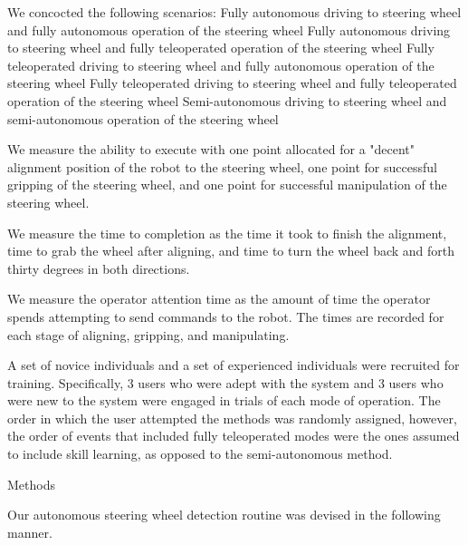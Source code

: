 We concocted the following scenarios:
Fully autonomous driving to steering wheel and fully autonomous operation of the steering wheel
Fully autonomous driving to steering wheel and fully teleoperated operation of the steering wheel
Fully teleoperated driving to steering wheel and fully autonomous operation of the steering wheel
Fully teleoperated driving to steering wheel and fully teleoperated operation of the steering wheel
Semi-autonomous driving to steering wheel and semi-autonomous operation of the steering wheel

We measure the ability to execute with one point allocated for a "decent" alignment position of the robot to the steering wheel, one point for successful gripping of the steering wheel, and one point for successful manipulation of the steering wheel.

We measure the time to completion as the time it took to finish the alignment, time to grab the wheel after aligning, and time to turn the wheel back and forth thirty degrees in both directions.

We measure the operator attention time as the amount of time the operator spends attempting to send commands to the robot.  The times are recorded for each stage of aligning, gripping, and manipulating.

A set of novice individuals and a set of experienced individuals were recruited for training.  Specifically, 3 users who were adept with the system and 3 users who were new to the system were engaged in trials of each mode of operation.  The order in which the user attempted the methods was randomly assigned, however, the order of events that included fully teleoperated modes were the ones assumed to include skill learning, as opposed to the semi-autonomous method.

Methods

Our autonomous steering wheel detection routine was devised in the following manner.